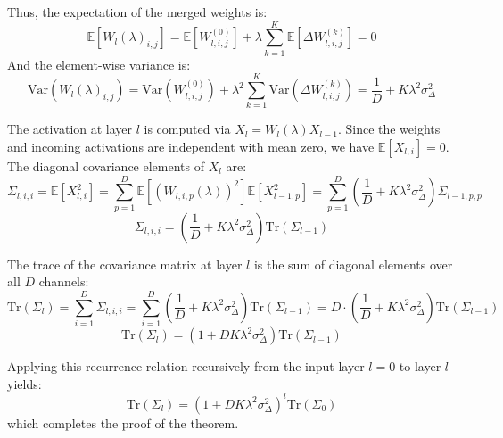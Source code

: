 \documentclass{article}
\theoremstyle{plain}
\theoremstyle{definition}
\theoremstyle{remark}
\begin{document}
Thus, the expectation of the merged weights is:
$$\mathbb{E}\left[W_l(\lambda)_{i,j}\right] = \mathbb{E}\left[W_{l,i,j}^{(0)}\right] + \lambda \sum_{k=1}^K \mathbb{E}\left[\Delta W_{l,i,j}^{(k)}\right] = 0$$
And the element-wise variance is:
$$\text{Var}\left(W_l(\lambda)_{i,j}\right) = \text{Var}\left(W_{l,i,j}^{(0)}\right) + \lambda^2 \sum_{k=1}^K \text{Var}\left(\Delta W_{l,i,j}^{(k)}\right) = \frac{1}{D} + K \lambda^2 \sigma_{\Delta}^2$$

The activation at layer $l$ is computed via $X_l = W_l(\lambda) X_{l-1}$. Since the weights and incoming activations are independent with mean zero, we have $\mathbb{E}[X_{l, i}] = 0$.
The diagonal covariance elements of $X_l$ are:
$$\Sigma_{l, i, i} = \mathbb{E}[X_{l,i}^2] = \sum_{p=1}^D \mathbb{E}\left[ \left(W_{l,i,p}(\lambda)\right)^2 \right] \mathbb{E}\left[ X_{l-1,p}^2 \right] = \sum_{p=1}^D \left( \frac{1}{D} + K \lambda^2 \sigma_{\Delta}^2 \right) \Sigma_{l-1, p, p}$$
$$\Sigma_{l, i, i} = \left( \frac{1}{D} + K \lambda^2 \sigma_{\Delta}^2 \right) \text{Tr}(\Sigma_{l-1})$$

The trace of the covariance matrix at layer $l$ is the sum of diagonal elements over all $D$ channels:
$$\text{Tr}(\Sigma_l) = \sum_{i=1}^D \Sigma_{l, i, i} = \sum_{i=1}^D \left( \frac{1}{D} + K \lambda^2 \sigma_{\Delta}^2 \right) \text{Tr}(\Sigma_{l-1}) = D \cdot \left( \frac{1}{D} + K \lambda^2 \sigma_{\Delta}^2 \right) \text{Tr}(\Sigma_{l-1})$$
$$\text{Tr}(\Sigma_l) = \left( 1 + D K \lambda^2 \sigma_{\Delta}^2 \right) \text{Tr}(\Sigma_{l-1})$$

Applying this recurrence relation recursively from the input layer $l=0$ to layer $l$ yields:
$$\text{Tr}(\Sigma_l) = \left( 1 + D K \lambda^2 \sigma_{\Delta}^2 \right)^l \text{Tr}(\Sigma_0)$$
which completes the proof of the theorem.
\end{document}
